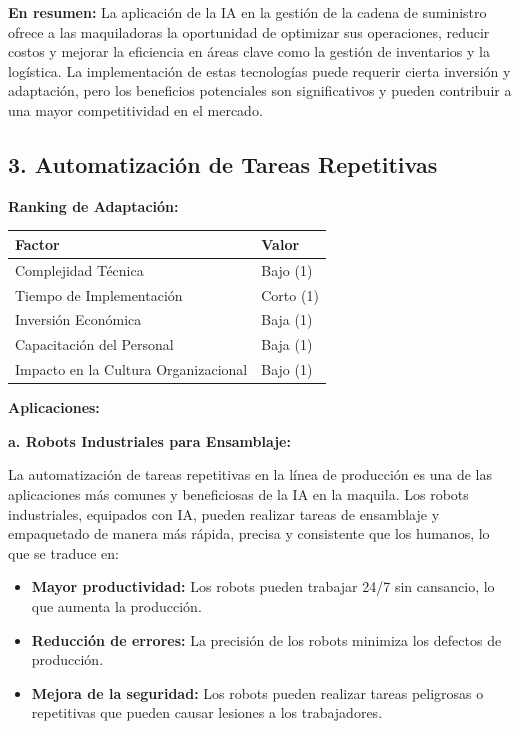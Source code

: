 \documentclass[
  10pt,
  letterpaper,
]{book}
\providecommand{\tightlist}{%
  \setlength{\itemsep}{0pt}\setlength{\parskip}{0pt}}\usepackage{longtable,booktabs,array}
\begin{document}
\textbf{En resumen:} La aplicación de la IA en la gestión de la cadena
de suministro ofrece a las maquiladoras la oportunidad de optimizar sus
operaciones, reducir costos y mejorar la eficiencia en áreas clave como
la gestión de inventarios y la logística. La implementación de estas
tecnologías puede requerir cierta inversión y adaptación, pero los
beneficios potenciales son significativos y pueden contribuir a una
mayor competitividad en el mercado.

\subsection{3. Automatización de Tareas
Repetitivas}\label{automatizaciuxf3n-de-tareas-repetitivas}

\textbf{Ranking de Adaptación:}

\begin{longtable}[]{@{}ll@{}}
\toprule\noalign{}
Factor & Valor \\
\midrule\noalign{}
\endhead
\bottomrule\noalign{}
\endlastfoot
Complejidad Técnica & Bajo (1) \\
Tiempo de Implementación & Corto (1) \\
Inversión Económica & Baja (1) \\
Capacitación del Personal & Baja (1) \\
Impacto en la Cultura Organizacional & Bajo (1) \\
\end{longtable}

\textbf{Aplicaciones:}

\textbf{a. Robots Industriales para Ensamblaje:}

La automatización de tareas repetitivas en la línea de producción es una
de las aplicaciones más comunes y beneficiosas de la IA en la maquila.
Los robots industriales, equipados con IA, pueden realizar tareas de
ensamblaje y empaquetado de manera más rápida, precisa y consistente que
los humanos, lo que se traduce en:

\begin{itemize}
\tightlist
\item
  \textbf{Mayor productividad:} Los robots pueden trabajar 24/7 sin
  cansancio, lo que aumenta la producción.
\item
  \textbf{Reducción de errores:} La precisión de los robots minimiza los
  defectos de producción.
\item
  \textbf{Mejora de la seguridad:} Los robots pueden realizar tareas
  peligrosas o repetitivas que pueden causar lesiones a los
  trabajadores.
\end{itemize}
\end{document}
